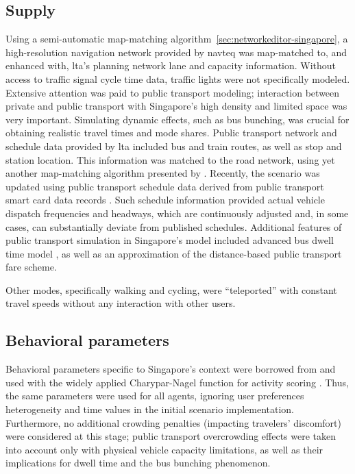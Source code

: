 \subsection{Supply}
Using a semi-automatic map-matching algorithm~\ref{sec:networkeditor-singapore}, a high-resolution navigation network provided by \gls{navteq} was map-matched to, and enhanced with, \gls{lta}'s planning network lane and capacity information. Without access to traffic signal cycle time data, traffic lights were not specifically modeled. Extensive attention was paid to public transport modeling; interaction between private and public transport with Singapore’s high density and limited space was very important. Simulating dynamic effects, such as bus bunching, was crucial for obtaining realistic travel times and mode shares. Public transport network and schedule data provided by \gls{lta} included bus and train routes, as well as stop and station location. This information was matched to the road network, using yet another map-matching algorithm presented by \citet[][]{Ordonez_HKSTS_2011, Ordonez_Webpage_2011_4}. Recently, the scenario was updated using public transport schedule data derived from public transport smart card data records \citet[][]{Fourie_TechRep_FCL_2014}. Such schedule information provided actual vehicle dispatch frequencies and headways, which are continuously adjusted and, in some cases, can substantially deviate from published schedules. Additional features of public transport simulation in Singapore’s model included advanced bus dwell time model \citep[][]{SunEtAl_TransResA_2014}, as well as an approximation of the distance-based public transport fare scheme.

Other modes, specifically walking and cycling, were ``teleported'' with constant travel speeds without any interaction with other users. 

\subsection{Behavioral parameters}
Behavioral parameters specific to Singapore's context were borrowed from \citet[][]{LTA_unpub_2009} and used with the widely applied Charypar-Nagel function for activity scoring \citet[][]{CharyparNagel2005ga4acts}. Thus, the same parameters were used for all agents, ignoring user preferences heterogeneity and time values in the initial scenario implementation. Furthermore, no additional crowding penalties (impacting travelers' discomfort) were considered at this stage; public transport overcrowding effects were taken into account only with physical vehicle capacity limitations, as well as their implications for dwell time and the bus bunching phenomenon. 

